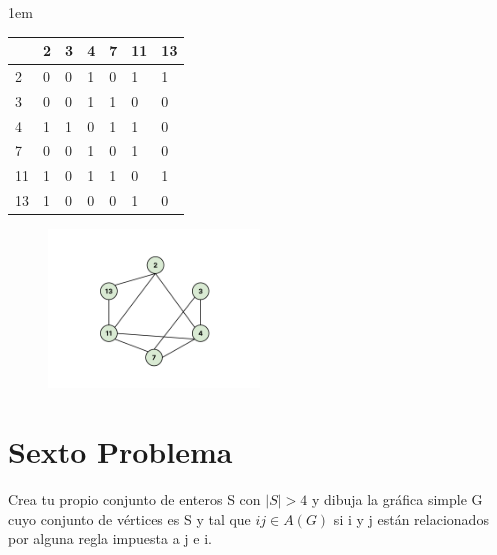 \documentclass[journal,12pt,onecolumn]{IEEEtran}                %
\newenvironment{SmallIndentation}[1][0.75em]                    %
        {\begin{adjustwidth}{#1}{}\begin{footnotesize}}             %
        {\end{footnotesize}\end{adjustwidth}}                       %
\theoremstyle{break}                                            %
\begin{document}
\begin{landscape}
\begin{SmallIndentation}[1em]
            \begin{tabular}{|l|l|l|l|l|l|l|}
                \hline
                    & 2 & 3 & 4 & 7 & 11 & 13   \\ \hline
                2   & 0 & 0 & 1 & 0 & 1  & 1    \\ \hline
                3   & 0 & 0 & 1 & 1 & 0  & 0    \\ \hline
                4   & 1 & 1 & 0 & 1 & 1  & 0    \\ \hline
                7   & 0 & 0 & 1 & 0 & 1  & 0    \\ \hline
                11  & 1 & 0 & 1 & 1 & 0  & 1    \\ \hline
                13  & 1 & 0 & 0 & 0 & 1  & 0    \\ \hline
            \end{tabular}

            \begin{figure}[h]
                \includegraphics[width=0.5\textwidth]{5}
            \end{figure}
        \end{SmallIndentation}
    \end{landscape}

    \section*{Sexto Problema}
        Crea tu propio conjunto de enteros S con $|S| > 4$ y dibuja 
        la gráfica simple G cuyo conjunto de vértices es S y tal que 
        $ij \in A(G)$ si i y j están relacionados por alguna 
        regla impuesta a j e i.
\end{document}
